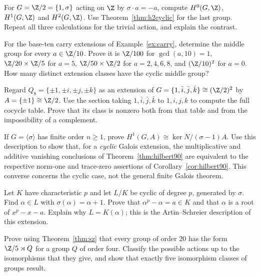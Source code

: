 \begin{exercise}[$\star$]\label{ex:h1sign}
For $G=\Z/2=\{1,\sigma\}$ acting on $\Z$ by $\sigma\cdot a=-a$, compute $H^0(G,\Z)$, $H^1(G,\Z)$ and $H^2(G,\Z)$. Use Theorem~\ref{thm:h2cyclic} for the last group. Repeat all three calculations for the trivial action, and explain the contrast.
\end{exercise}

\begin{exercise}[$\star$]\label{ex:carry10}
For the base-ten carry extensions of Example~\ref{ex:carry}, determine the middle group for every $a\in\Z/10$. Prove it is $\Z/100$ for $\gcd(a,10)=1$, $\Z/20\times\Z/5$ for $a=5$, $\Z/50\times\Z/2$ for $a=2,4,6,8$, and $(\Z/10)^2$ for $a=0$. How many distinct extension classes have the cyclic middle group?
\end{exercise}

\begin{exercise}[$\star\star$]\label{ex:quaternion}
Regard $Q_8=\{\pm1,\pm i,\pm j,\pm k\}$ as an extension of
$G=\{1,\bar i,\bar j,\bar k\}\cong(\Z/2)^2$ by $A=\{\pm1\}\cong\Z/2$. Use the section taking $1,\bar i,\bar j,\bar k$ to $1,i,j,k$ to compute the full cocycle table. Prove that its class is nonzero both from that table and from the impossibility of a complement.
\end{exercise}

\begin{exercise}[$\star\star$]\label{ex:cyclich1}
If $G=\langle\sigma\rangle$ has finite order $n\ge1$, prove
$H^1(G,A)\cong\ker N/(\sigma-1)A$.
Use this description to show that, for a \emph{cyclic} Galois extension, the multiplicative and additive vanishing conclusions of Theorem~\ref{thm:hilbert90} are equivalent to the respective norm-one and trace-zero assertions of Corollary~\ref{cor:hilbert90}. This converse concerns the cyclic case, not the general finite Galois theorem.
\end{exercise}

\begin{exercise}[$\star\star$]\label{ex:artinschreier}
Let $K$ have characteristic $p$ and let $L/K$ be cyclic of degree $p$, generated by $\sigma$. Find $\alpha\in L$ with $\sigma(\alpha)=\alpha+1$. Prove that
$\alpha^p-\alpha=a\in K$ and that $\alpha$ is a root of $x^p-x-a$. Explain why $L=K(\alpha)$; this is the Artin--Schreier description of this extension.
\end{exercise}

\begin{exercise}[$\star\star\star$]\label{ex:order20}
Prove using Theorem~\ref{thm:sz} that every group of order $20$ has the form $\Z/5\rtimes Q$ for a group $Q$ of order four. Classify the possible actions up to the isomorphisms that they give, and show that exactly five isomorphism classes of groups result.
\end{exercise}

